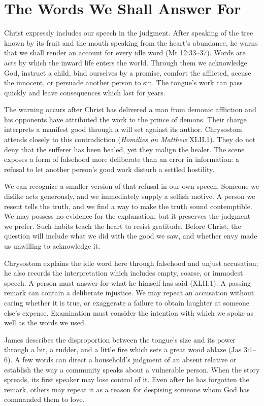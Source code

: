 \section{The Words We Shall Answer For}

Christ expressly includes our speech in the judgment. After speaking of the tree known by its fruit and the mouth speaking from the heart's abundance, he warns that we shall render an account for every idle word (Mt 12:33--37). Words are acts by which the inward life enters the world. Through them we acknowledge God, instruct a child, bind ourselves by a promise, comfort the afflicted, accuse the innocent, or persuade another person to sin. The tongue's work can pass quickly and leave consequences which last for years.

The warning occurs after Christ has delivered a man from demonic affliction and his opponents have attributed the work to the prince of demons. Their charge interprets a manifest good through a will set against its author. Chrysostom attends closely to this contradiction (\emph{Homilies on Matthew} XLII.1). They do not deny that the sufferer has been healed, yet they malign the healer. The scene exposes a form of falsehood more deliberate than an error in information: a refusal to let another person's good work disturb a settled hostility.

We can recognize a smaller version of that refusal in our own speech. Someone we dislike acts generously, and we immediately supply a selfish motive. A person we resent tells the truth, and we find a way to make the truth sound contemptible. We may possess no evidence for the explanation, but it preserves the judgment we prefer. Such habits teach the heart to resist gratitude. Before Christ, the question will include what we did with the good we saw, and whether envy made us unwilling to acknowledge it.

Chrysostom explains the idle word here through falsehood and unjust accusation; he also records the interpretation which includes empty, coarse, or immodest speech. A person must answer for what he himself has said (XLII.1). A passing remark can contain a deliberate injustice. We may repeat an accusation without caring whether it is true, or exaggerate a failure to obtain laughter at someone else's expense. Examination must consider the intention with which we spoke as well as the words we used.

James describes the disproportion between the tongue's size and its power through a bit, a rudder, and a little fire which sets a great wood ablaze (Jas 3:1--6). A few words can direct a household's judgment of an absent relative or establish the way a community speaks about a vulnerable person. When the story spreads, its first speaker may lose control of it. Even after he has forgotten the remark, others may repeat it as a reason for despising someone whom God has commanded them to love.

